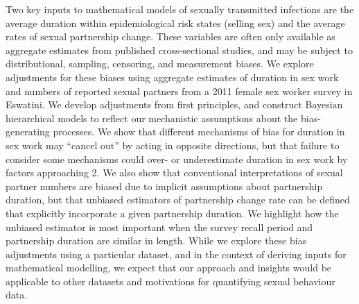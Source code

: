 Two key inputs to mathematical models of sexually transmitted infections are
the average duration within epidemiological risk states (\eg selling sex) and
the average rates of sexual partnership change.
These variables are often only available as aggregate estimates from
published cross-sectional studies, and may be subject to
distributional, sampling, censoring, and measurement biases.
We explore adjustments for these biases using aggregate estimates of
duration in sex work and numbers of reported sexual partners
from a 2011 female sex worker survey in Eswatini.
We develop adjustments from first principles,
and construct Bayesian hierarchical models to reflect
our mechanistic assumptions about the bias-generating processes.
We show that different mechanisms of bias for duration in sex work may
``cancel out'' by acting in opposite directions,
but that failure to consider some mechanisms could over- or underestimate
duration in sex work by factors approaching 2.
We also show that conventional interpretations of sexual partner numbers
are biased due to implicit assumptions about partnership duration,
but that unbiased estimators of partnership change rate can be defined
that explicitly incorporate a given partnership duration.
We highlight how the unbiased estimator is most important when
the survey recall period and partnership duration are similar in length.
While we explore these bias adjustments using a particular dataset,
and in the context of deriving inputs for mathematical modelling,
we expect that our approach and insights would be applicable to
other datasets and motivations for quantifying sexual behaviour data.
